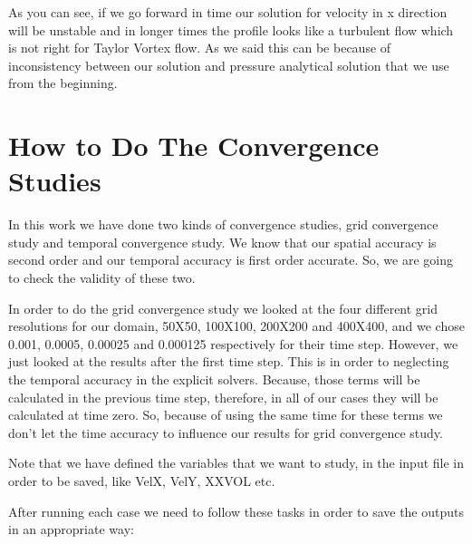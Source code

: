 \documentclass[10pt] {article}
\begin{document}
As you can see, if we go forward in time our solution for velocity in x direction will be unstable and in longer times the profile looks like a turbulent flow which is not right for Taylor Vortex flow. As we said this can be because of inconsistency between our solution and pressure analytical solution that we use from the beginning. 

\section{How to Do The Convergence Studies}

In this work we have done two kinds of convergence studies, grid convergence study and temporal convergence study. We know that our spatial accuracy is second order and our temporal accuracy is first order accurate. So, we are going to check the validity of these two.

In order to do the grid convergence study we looked at the four different grid resolutions for our domain, 50X50, 100X100, 200X200 and 400X400, and we chose 0.001, 0.0005, 0.00025 and 0.000125 respectively for their time step. However, we just looked at the results after the first time step. This is in  order to neglecting the temporal accuracy in the explicit solvers. Because, those terms will be calculated in the previous time step, therefore, in all of our cases they will be calculated at time zero. So, because of using the same time for these terms we don't let the time accuracy to influence our results for grid convergence study. 

Note that we have defined the variables that we want to study, in the input file in order to be saved, like VelX, VelY, XXVOL etc.

After running each case we need to follow these tasks in order to save the outputs in an appropriate way:
\end{document}
